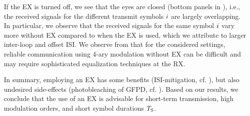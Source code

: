 If the \ac{EX} is turned off, we see that the eyes are closed (bottom panels in ), i.e., the received signals for the different transmit symbols $i$ are largely overlapping.
In particular, we observe that the received signals for the same symbol $i$ vary more without \ac{EX} compared to when the \ac{EX} is used, which we attribute to larger inter-loop and offset \ac{ISI}. We observe from  that for the considered settings, reliable communication using 4-ary modulation without \ac{EX} can be difficult and may require sophisticated equalization techniques at the \ac{RX}.

In summary, employing an \ac{EX} has some benefits (\ac{ISI}-mitigation, cf. ), but also undesired side-effects (photobleaching of \ac{GFPD}, cf. ).
Based on our results, we conclude that the use of an \ac{EX} is advisable for short-term transmission, high modulation orders, and short symbol durations $T_{\mathrm{S}}$.
